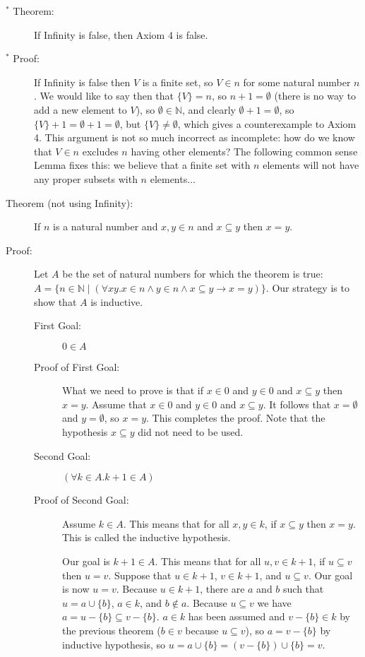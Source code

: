 \documentclass[12pt]{book}
\begin{document}
\begin{description}
\begin{description}
\end{description}

\item[$^*$ Theorem:]  If Infinity is false, then Axiom 4 is false.

\item[$^*$ Proof:]  If Infinity is false then $V$ is a finite set, so $V \in n$ for some natural number $n$.   We would like to say then that $\{V\}=n$, so $n+1 = \emptyset$ (there is no way to add a new element to $V$), so $\emptyset \in {\mathbb N}$, and clearly $\emptyset+1=\emptyset$, so $\{V\}+1=\emptyset+1=\emptyset$, but $\{V\} \neq \emptyset$, which  gives a counterexample to Axiom 4.  This argument is not so much incorrect as incomplete:  how do we know that $V \in n$ excludes $n$ having other elements?   The following common sense Lemma fixes this:  we believe that a finite set with $n$ elements will not have any proper subsets with $n$ elements$\ldots$

\item[Theorem (not using Infinity):] If $n$ is a natural number and
$x,y \in n$ and $x \subseteq y$ then $x=y$.

\item[Proof:] Let $A$ be the set of natural numbers for which the
theorem is true: $A = \{n \in {\mathbb N} \mid (\forall xy.x\in n
\wedge y \in n \wedge x \subseteq y \rightarrow x=y)\}$.  Our strategy
is to show that $A$ is inductive.

\begin{description}

\item[First Goal:]  $0 \in A$


\item[Proof of First Goal:]
What we need to prove is that if $x \in 0$ and $y \in 0$ and $x
\subseteq y$ then $x=y$.  Assume that $x \in 0$ and $y \in 0$ and $x
\subseteq y$.  It follows that $x=\emptyset$ and $y = \emptyset$, so
$x=y$.  This completes the proof.  Note that the hypothesis $x
\subseteq y$ did not need to be used.


\item[Second Goal:]  $(\forall k \in A.k+1 \in A)$

\item[Proof of Second Goal:]

Assume $k \in A$.  This means that for all $x,y \in k$, if $x
\subseteq y$ then $x=y$.  This is called the inductive hypothesis.

Our goal is $k+1 \in A$.  This means that for all $u,v \in k+1$, if $u
\subseteq v$ then $u=v$.  Suppose that $u \in k+1$, $v \in k+1$, and
$u \subseteq v$.  Our goal is now $u=v$.  Because $u \in k+1$, there
are $a$ and $b$ such that $u = a \cup \{b\}$, $a \in k$, and $b
\not\in a$.  Because $u \subseteq v$ we have $a = u-\{b\} \subseteq
v-\{b\}$.  $a \in k$ has been assumed and $v-\{b\} \in k$ by the
previous theorem ($b \in v$ because $u \subseteq v$), so $a = v-\{b\}$
by inductive hypothesis, so $u = a \cup \{b\} = (v-\{b\})\cup\{b\} =
v$.


\end{description}
\end{description}
\end{document}
